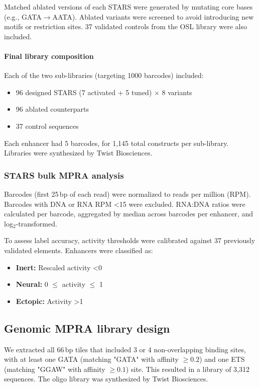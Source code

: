Matched ablated versions of each STARS were generated by mutating core bases (e.g., GATA\(\rightarrow\)AATA). Ablated variants were screened to avoid introducing new motifs or restriction sites. 37 validated controls from the OSL library were also included.

\paragraph{Final library composition}

Each of the two sub-libraries (targeting 1000 barcodes) included:
\begin{itemize}
  \item 96 designed STARS (7 activated + 5 tuned) \(\times\) 8 variants
  \item 96 ablated counterparts
  \item 37 control sequences
\end{itemize}

Each enhancer had 5 barcodes, for 1,145 total constructs per sub-library. Libraries were synthesized by Twist Biosciences.

\subsubsection{STARS bulk MPRA analysis}

Barcodes (first 25\,bp of each read) were normalized to reads per million (RPM). Barcodes with DNA or RNA RPM \textless 15 were excluded. RNA:DNA ratios were calculated per barcode, aggregated by median across barcodes per enhancer, and log$_2$-transformed.

To assess label accuracy, activity thresholds were calibrated against 37 previously validated elements. Enhancers were classified as:
\begin{itemize}
  \item \textbf{Inert:} Rescaled activity \textless 0
  \item \textbf{Neural:} 0 \(\leq\) activity \(\leq\) 1
  \item \textbf{Ectopic:} Activity \textgreater 1
\end{itemize}

\subsection{Genomic MPRA library design}

We extracted all 66\,bp tiles that included 3 or 4 non-overlapping binding sites, with at least one GATA (matching "GATA" with affinity \(\geq 0.2\)) and one ETS (matching "GGAW" with affinity \(\geq 0.1\)) site. This resulted in a library of 3,312 sequences. The oligo library was synthesized by Twist Biosciences.

